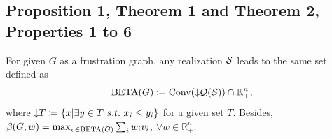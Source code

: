 \subsection{\texorpdfstring{Proposition 1, Theorem 1 and Theorem 2, Properties 1 to 6}{}}\label{sec:proofs1}
\setcounter{theorem}{0}
\setcounter{proposition}{0}
\begin{proposition}\label{thm:beta}
For given $G$ as a frustration graph, any realization ${\cal S}$ leads to the same set  defined as
	\begin{equation}
		\operatorname{BETA}(G) \coloneqq \mathrm{Conv}(\downarrow\hspace{-0.3em} {\cal Q}({\cal S})) \cap \mathbb{R}_+^n,
	\end{equation}
    where $\downarrow\hspace{-0.3em} T \coloneqq \{x|\exists y \in T\ s.t.\ x_i\le y_i\}$ for a given set $T$.
	Besides, $\beta(G,w) = \max_{v\in \operatorname{BETA}(G)} \sum_i w_i v_i$, $\forall w\in \mathbb{R}_+^n$.
\end{proposition}
